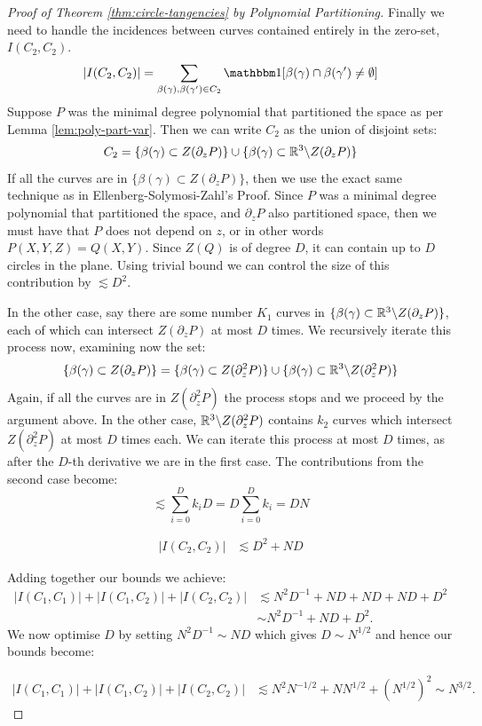 \begin{proof}[Proof of Theorem \ref{thm:circle-tangencies} by Polynomial Partitioning]
Finally we need to handle the incidences between curves contained entirely in the zero-set, $I(C_2,C_2)$. 
\[
    |I(C_2,C_2)| = \sum_{\beta(\gamma), \beta(\gamma') \in C_2} \OO[\beta(\gamma) \cap \beta(\gamma') \neq \emptyset]
\]
Suppose $P$ was the minimal degree polynomial that partitioned the space as per Lemma \ref{lem:poly-part-var}. Then we can write $C_2$ as the union of disjoint sets:
\[
C_2 = \{\beta(\gamma) \subset Z(\partial_z P)\} \cup \{\beta(\gamma) \subset \mathbb R^3 \backslash Z(\partial_z P)\}
\]
If all the curves are in $\{\beta(\gamma) \subset Z(\partial_z P)\}$, then we use the exact same technique as in Ellenberg-Solymosi-Zahl's Proof.
Since $P$ was a minimal degree polynomial that partitioned the space, and $\partial_z P$ also partitioned space, then we must have that $P$ does not depend on $z$, or in other words $P(X,Y,Z) = Q(X,Y)$. Since $Z(Q)$ is of degree $D$, it can contain up to $D$ circles in the plane.  Using trivial bound we can control the size of this contribution by $\lesssim D^2$.

In the other case, say there are some number $K_1$ curves in $\{\beta(\gamma) \subset \mathbb R^3 \backslash Z(\partial_z P)\}$, each of which can intersect $ Z(\partial_z P)$ at most $D$ times. 
We recursively iterate this process now, examining now the set: 
\[\{\beta(\gamma) \subset Z(\partial_z P)\} = \{\beta(\gamma) \subset Z(\partial^2_z P)\} \cup \{\beta(\gamma) \subset \mathbb R^3 \backslash Z(\partial^2_z P)\}\]
Again, if all the curves are in $Z(\partial^2_z P)$ the process stops and we proceed by the argument above. In the other case, $\mathbb R^3 \backslash Z(\partial^2_z P)$
contains $k_2$ curves which intersect $ Z(\partial^2_z P)$ at most $D$ times each. We can iterate this process at most $D$ times, as after the $D$-th derivative we are in the first case. The contributions from the second case become:
\[
    \lesssim \sum_{i=0}^D k_i D = D \sum_{i=0}^D k_i = DN
\]

\begin{align*}
    |I(C_2,C_2)| &\lesssim D^2 + ND
\end{align*}

Adding together our bounds we achieve:
\begin{align*}
    |I(C_1,C_1)|+|I(C_1,C_2)|+|I(C_2,C_2)| &\lesssim N^2D^{-1} + ND + ND + ND + D^2 \\
    &\sim N^2D^{-1} + ND + D^2.
\end{align*}
We now optimise $D$ by setting $N^2D^{-1} \sim ND$ which gives $D \sim N^{1/2}$ and hence our bounds become:

\begin{align*}
    |I(C_1,C_1)|+|I(C_1,C_2)|+|I(C_2,C_2)| &\lesssim N^2N^{-1/2} + NN^{1/2} + (N^{1/2})^2 \sim N^{3/2}.
\end{align*}
\end{proof}

